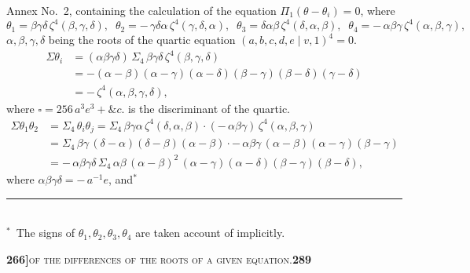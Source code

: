\documentclass[11pt]{article}
\newcommand{\Cdel}{\mid}
\begin{document}
\medskip

\noindent Annex No.~2, containing the calculation of the equation $\Pi_1(\theta - \theta_i) = 0$, where
\[
   \theta_1 = \beta\gamma\delta\,\zeta^4(\beta, \gamma, \delta),\;\;
   \theta_2 = -\,\gamma\delta\alpha\,\zeta^4(\gamma, \delta, \alpha),\;\;
   \theta_3 = \delta\alpha\beta\,\zeta^4(\delta, \alpha, \beta),\;\;
   \theta_4 = -\,\alpha\beta\gamma\,\zeta^4(\alpha, \beta, \gamma),
\]
$\alpha, \beta, \gamma, \delta$ being the roots of the quartic equation $(a, b, c, d, e \Cdel v, 1)^4 = 0$.
\[
\begin{aligned}
   \Sigma\theta_i &= (\alpha\beta\gamma\delta)\,\Sigma_4\,\beta\gamma\delta\,\zeta^4(\beta, \gamma, \delta)\\
   &= -(\alpha - \beta)(\alpha - \gamma)(\alpha - \delta)(\beta - \gamma)(\beta - \delta)(\gamma - \delta)\\
   &= -\,\zeta^4(\alpha, \beta, \gamma, \delta),
\end{aligned}
\]
where $\square = 256\,a^3 e^3 + \&c.$ is the discriminant of the quartic.
\[
\begin{aligned}
   \Sigma\theta_1\theta_2 &= \Sigma_4\,\theta_i\theta_j = \Sigma_4\,\beta\gamma\alpha\,\zeta^4(\delta, \alpha, \beta)\cdot(-\,\alpha\beta\gamma)\,\zeta^4(\alpha, \beta, \gamma)\\
   &= \Sigma_4\,\beta\gamma\,(\delta - \alpha)(\delta - \beta)(\alpha - \beta)\cdot-\,\alpha\beta\gamma\,(\alpha - \beta)(\alpha - \gamma)(\beta - \gamma)\\
   &= -\,\alpha\beta\gamma\delta\,\Sigma_4\,\alpha\beta\,(\alpha - \beta)^2\,(\alpha - \gamma)(\alpha - \delta)(\beta - \gamma)(\beta - \delta),
\end{aligned}
\]
where $\alpha\beta\gamma\delta = -\,a^{-1}e$, and$^*$
\medskip

\noindent\rule[0.5ex]{2cm}{0.4pt}\\
{\footnotesize $^*$\ The signs of $\theta_1, \theta_2, \theta_3, \theta_4$ are taken account of implicitly.}

\newpage
\setcounter{page}{289}

\noindent\textbf{266]}\hfill\textsc{of the differences of the roots of a given equation.}\hfill\textbf{289}

\medskip
\end{document}
